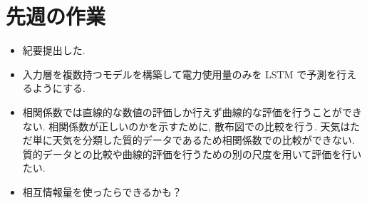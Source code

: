 \section{先週の作業}
\begin{itemize}
        \item 紀要提出した. 
        \item 入力層を複数持つモデルを構築して電力使用量のみを LSTM で予測を行えるようにする.
        \item 相関係数では直線的な数値の評価しか行えず曲線的な評価を行うことができない. 相関係数が正しいのかを示すために, 散布図での比較を行う.
        天気はただ単に天気を分類した質的データであるため相関係数での比較ができない. 質的データとの比較や曲線的評価を行うための別の尺度を用いて評価を行いたい. 
        \item 相互情報量を使ったらできるかも？
\end{itemize}

